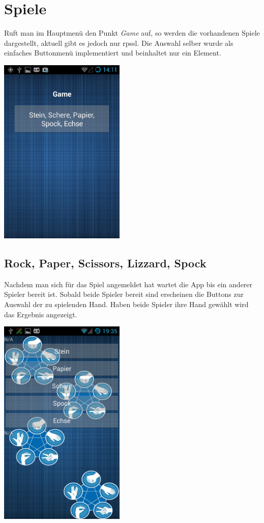 \section{Spiele}
Ruft man im Hauptmenü den Punkt \textit{Game} auf, so werden die vorhandenen Spiele dargestellt, aktuell gibt es jedoch nur \gls{rpssl}. Die Auswahl selber wurde als einfaches Buttonmenü implementiert und beinhaltet nur ein Element.
\begin{capfigure}
	\includegraphics[width=6cm]{images/app/gamelist}
\end{capfigure}


\subsection{Rock, Paper, Scissors, Lizzard, Spock}
Nachdem man sich für das Spiel angemeldet hat wartet die App bis ein anderer Spieler bereit ist. Sobald beide Spieler bereit sind erscheinen die Buttons zur Auswahl der zu spielenden Hand. Haben beide Spieler ihre Hand gewählt wird das Ergebnis angezeigt.

\begin{capfigure}
	\includegraphics[width=6cm]{images/app/rpssl}
\end{capfigure}

